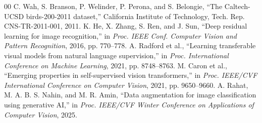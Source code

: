 \documentclass[conference]{IEEEtran}
\begin{document}
\begin{thebibliography}{00}
 C. Wah, S. Branson, P. Welinder, P. Perona, and S. Belongie, ``The Caltech-UCSD birds-200-2011 dataset,'' California Institute of Technology, Tech. Rep. CNS-TR-2011-001, 2011.
 K. He, X. Zhang, S. Ren, and J. Sun, ``Deep residual learning for image recognition,'' in \emph{Proc. IEEE Conf. Computer Vision and Pattern Recognition}, 2016, pp. 770--778.
 A. Radford et al., ``Learning transferable visual models from natural language supervision,'' in \emph{Proc. International Conference on Machine Learning}, 2021, pp. 8748--8763.
 M. Caron et al., ``Emerging properties in self-supervised vision transformers,'' in \emph{Proc. IEEE/CVF International Conference on Computer Vision}, 2021, pp. 9650--9660.
 A. Rahat, M. A. B. S. Nahin, and M. R. Amin, ``Data augmentation for image classification using generative AI,'' in \emph{Proc. IEEE/CVF Winter Conference on Applications of Computer Vision}, 2025.
\end{thebibliography}
\end{document}
